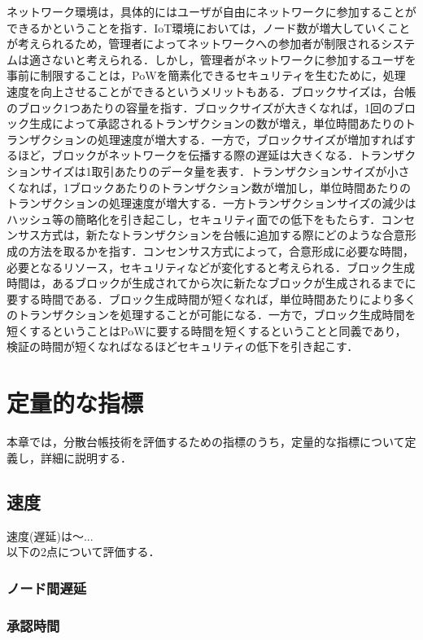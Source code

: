 \documentclass[japanese, macos]{KU2}
\begin{document}
ネットワーク環境は，具体的にはユーザが自由にネットワークに参加することができるかということを指す．IoT環境においては，ノード数が増大していくことが考えられるため，管理者によってネットワークへの参加者が制限されるシステムは適さないと考えられる．しかし，管理者がネットワークに参加するユーザを事前に制限することは，PoWを簡素化できるセキュリティを生むために，処理速度を向上させることができるというメリットもある．ブロックサイズは，台帳のブロック1つあたりの容量を指す．ブロックサイズが大きくなれば，1回のブロック生成によって承認されるトランザクションの数が増え，単位時間あたりのトランザクションの処理速度が増大する．一方で，ブロックサイズが増加すればするほど，ブロックがネットワークを伝播する際の遅延は大きくなる．トランザクションサイズは1取引あたりのデータ量を表す．トランザクションサイズが小さくなれば，1ブロックあたりのトランザクション数が増加し，単位時間あたりのトランザクションの処理速度が増大する．一方トランザクションサイズの減少はハッシュ等の簡略化を引き起こし，セキュリティ面での低下をもたらす．コンセンサス方式は，新たなトランザクションを台帳に追加する際にどのような合意形成の方法を取るかを指す．コンセンサス方式によって，合意形成に必要な時間，必要となるリソース，セキュリティなどが変化すると考えられる．ブロック生成時間は，あるブロックが生成されてから次に新たなブロックが生成されるまでに要する時間である．ブロック生成時間が短くなれば，単位時間あたりにより多くのトランザクションを処理することが可能になる．一方で，ブロック生成時間を短くするということはPoWに要する時間を短くするということと同義であり，検証の時間が短くなればなるほどセキュリティの低下を引き起こす．\\

\chapter{定量的な指標}
本章では，分散台帳技術を評価するための指標のうち，定量的な指標について定義し，詳細に説明する．

\section{速度}
速度(遅延)は〜...\\
以下の2点について評価する．
\subsection{ノード間遅延}
\subsection{承認時間}
\end{document}
